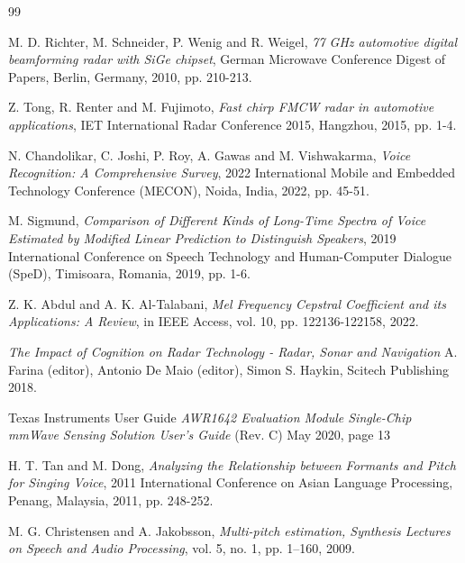 \begin{thebibliography}{99}


M. D. Richter, M. Schneider, P. Wenig and R. Weigel, 
{\em 77 GHz automotive digital beamforming radar with SiGe chipset},
German Microwave Conference Digest of Papers, Berlin, Germany, 2010, pp. 210-213.

Z. Tong, R. Renter and M. Fujimoto, 
{\em Fast chirp FMCW radar in automotive applications}, 
IET International Radar Conference 2015, Hangzhou, 2015, pp. 1-4.

N. Chandolikar, C. Joshi, P. Roy, A. Gawas and M. Vishwakarma, 
{\em Voice Recognition: A Comprehensive Survey}, 
2022 International Mobile and Embedded Technology Conference (MECON), 
Noida, India, 2022, pp. 45-51.

M. Sigmund, 
{\em Comparison of Different Kinds of Long-Time Spectra of Voice Estimated 
by Modified Linear Prediction to Distinguish Speakers}, 
2019 International Conference on Speech Technology and Human-Computer Dialogue (SpeD), 
Timisoara, Romania, 2019, pp. 1-6.

Z. K. Abdul and A. K. Al-Talabani, 
{\em Mel Frequency Cepstral Coefficient and its Applications: A Review}, 
in IEEE Access, vol. 10, pp. 122136-122158, 2022.

{\em The Impact of Cognition on Radar Technology - Radar, Sonar and Navigation}
A. Farina (editor), Antonio De Maio (editor), Simon S. Haykin, Scitech Publishing 2018.	

Texas Instruments User Guide
{\it AWR1642 Evaluation Module Single-Chip mmWave Sensing Solution User's Guide} (Rev. C) May 2020, page 13

H. T. Tan and M. Dong, 
{\em Analyzing the Relationship between Formants and Pitch for Singing Voice}, 
2011 International Conference on Asian Language Processing, Penang, Malaysia, 2011, pp. 248-252.

M. G. Christensen and A. Jakobsson, 
{\em Multi-pitch estimation, Synthesis Lectures on Speech and Audio Processing}, 
vol. 5, no. 1, pp. 1–160, 2009.


\end{thebibliography}

